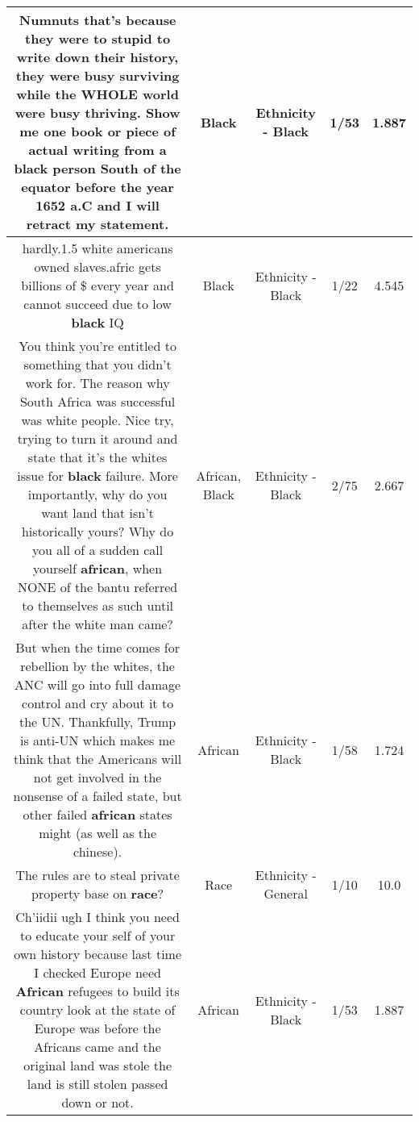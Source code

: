 \documentclass[11pt]{article}
\newlength\mylength
\begin{document}
\begin{center}
\begin{longtable}{|C{.65\mylength}|C{.30\mylength}|C{.12\mylength}|C{.12\mylength}|C{.12\mylength}|}
  \small {} Numnuts that's because they were to stupid to write down their history, they were busy surviving while the WHOLE world were busy thriving. Show me one book or piece of actual writing from a \textbf{black} person South of the equator before the year 1652 a.C and I will retract my statement.\normalsize   & Black & Ethnicity - Black & 1/53 & 1.887 \\  \hline
  \small hardly.1.5 white americans owned slaves.afric gets billions of \$ every year and cannot succeed due to low \textbf{black} IQ\normalsize   & Black & Ethnicity - Black & 1/22 & 4.545 \\  \hline
  \small You think you're entitled to something that you didn't work for. The reason why South Africa was successful was white people. Nice try, trying to turn it around and state that it's the whites issue for \textbf{black} failure. More importantly, why do you want land that isn't historically yours? Why do you all of a sudden call yourself \textbf{african}, when NONE of the bantu referred to themselves as such until after the white man came?\normalsize   & African, Black & Ethnicity - Black & 2/75 & 2.667 \\  \hline
  \small But when the time comes for rebellion by the whites, the ANC will go into full damage control and cry about it to the UN. Thankfully, Trump is anti-UN which makes me think that the Americans will not get involved in the nonsense of a failed state, but other failed \textbf{african} states might (as well as the chinese).\normalsize   & African & Ethnicity - Black & 1/58 & 1.724 \\  \hline
  \small The rules are to steal private property base on \textbf{race}?\normalsize   & Race & Ethnicity - General & 1/10 & 10.0 \\  \hline
  \small Ch'iidii ugh I think you need to educate your self of your own history because last time I checked Europe need \textbf{African} refugees to build its country look at the state of Europe was before the Africans came and the original land was stole the land is still stolen passed down or not.\normalsize   & African & Ethnicity - Black & 1/53 & 1.887 \\  \hline

\end{longtable}
\end{center}
\end{document}
